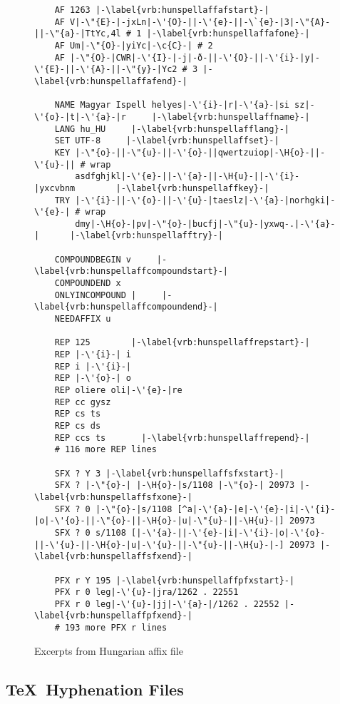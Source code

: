 \documentclass[postprint]{flammie}
\begin{document}
\begin{figure}[tbp]
  \centering
  \begin{lstlisting}
    AF 1263 |-\label{vrb:hunspellaffafstart}-|
    AF V|-\"{E}-|-jxLn|-\'{O}-||-\'{e}-||-\`{e}-|3|-\"{A}-||-\"{a}-|TtYc,4l # 1 |-\label{vrb:hunspellaffafone}-|
    AF Um|-\"{O}-|yiYc|-\c{C}-| # 2
    AF |-\"{O}-|CWR|-\'{I}-|-j|-ð-||-\'{O}-||-\'{i}-|y|-\'{E}-||-\'{A}-||-\"{y}-|Yc2 # 3 |-\label{vrb:hunspellaffafend}-|

    NAME Magyar Ispell helyes|-\'{i}-|r|-\'{a}-|si sz|-\'{o}-|t|-\'{a}-|r     |-\label{vrb:hunspellaffname}-|
    LANG hu_HU     |-\label{vrb:hunspellafflang}-|
    SET UTF-8     |-\label{vrb:hunspellaffset}-|
    KEY |-\"{o}-||-\"{u}-||-\'{o}-||qwertzuiop|-\H{o}-||-\'{u}-|| # wrap
        asdfghjkl|-\'{e}-||-\'{a}-||-\H{u}-||-\'{i}-|yxcvbnm        |-\label{vrb:hunspellaffkey}-|
    TRY |-\'{i}-||-\'{o}-||-\'{u}-|taeslz|-\'{a}-|norhgki|-\'{e}-| # wrap
        dmy|-\H{o}-|pv|-\"{o}-|bucfj|-\"{u}-|yxwq-.|-\'{a}-|      |-\label{vrb:hunspellafftry}-|
    
    COMPOUNDBEGIN v     |-\label{vrb:hunspellaffcompoundstart}-|
    COMPOUNDEND x     
    ONLYINCOMPOUND |     |-\label{vrb:hunspellaffcompoundend}-|
    NEEDAFFIX u     
    
    REP 125        |-\label{vrb:hunspellaffrepstart}-|
    REP |-\'{i}-| i       
    REP i |-\'{i}-|       
    REP |-\'{o}-| o       
    REP oliere oli|-\'{e}-|re
    REP cc gysz       
    REP cs ts       
    REP cs ds       
    REP ccs ts       |-\label{vrb:hunspellaffrepend}-|
    # 116 more REP lines
    
    SFX ? Y 3 |-\label{vrb:hunspellaffsfxstart}-|
    SFX ? |-\"{o}-| |-\H{o}-|s/1108 |-\"{o}-| 20973 |-\label{vrb:hunspellaffsfxone}-|
    SFX ? 0 |-\"{o}-|s/1108 [^a|-\'{a}-|e|-\'{e}-|i|-\'{i}-|o|-\'{o}-||-\"{o}-||-\H{o}-|u|-\"{u}-||-\H{u}-|] 20973
    SFX ? 0 s/1108 [|-\'{a}-||-\'{e}-|i|-\'{i}-|o|-\'{o}-||-\'{u}-||-\H{o}-|u|-\'{u}-||-\"{u}-||-\H{u}-|-] 20973 |-\label{vrb:hunspellaffsfxend}-|
    
    PFX r Y 195 |-\label{vrb:hunspellaffpfxstart}-|
    PFX r 0 leg|-\'{u}-|jra/1262 . 22551
    PFX r 0 leg|-\'{u}-|jj|-\'{a}-|/1262 . 22552 |-\label{vrb:hunspellaffpfxend}-|
    # 193 more PFX r lines
  \end{lstlisting}
  \caption{Excerpts from Hungarian affix file}
  \label{fig:hunspell-aff-examples}
\end{figure}

\subsection{\TeX\ Hyphenation Files}
\label{subsec:material-tex}
\end{document}
